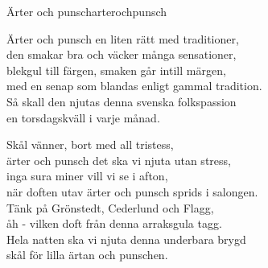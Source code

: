 \begin{song}{Ärter och punsch}{arterochpunsch}
\begin{vers}
Ärter och punsch en liten rätt med traditioner,\\
den smakar bra och väcker många sensationer,\\
blekgul till färgen, smaken går intill märgen,\\
med en senap som blandas enligt gammal tradition.\\
Så skall den njutas denna svenska folkspassion\\
en torsdagskväll i varje månad.\\
\end{vers}
\begin{vers}
Skål vänner, bort med all tristess,\\
ärter och punsch det ska vi njuta utan stress,\\
inga sura miner vill vi se i afton,\\
när doften utav ärter och punsch sprids i salongen.\\
Tänk på Grönstedt, Cederlund och Flagg,\\
åh - vilken doft från denna arraksgula tagg.\\
Hela natten ska vi njuta denna underbara brygd\\
skål för lilla ärtan och punschen.\\
\end{vers}
\end{song}


